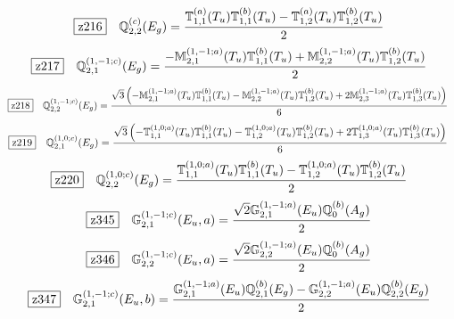 \documentclass[fleqn,10pt,landscape]{jsarticle}
\begin{document}
\begin{dmath*}
\hspace*{3mm}\fbox{z216}\quad \mathbb{Q}_{2,2}^{(c)}(E_{g})=\frac{\mathbb{T}_{1,1}^{(a)}(T_{u}) \mathbb{T}_{1,1}^{(b)}(T_{u}) - \mathbb{T}_{1,2}^{(a)}(T_{u}) \mathbb{T}_{1,2}^{(b)}(T_{u})}{2}
\end{dmath*}
\begin{dmath*}
\hspace*{3mm}\fbox{z217}\quad \mathbb{Q}_{2,1}^{(1,-1;c)}(E_{g})=\frac{- \mathbb{M}_{2,1}^{(1,-1;a)}(T_{u}) \mathbb{T}_{1,1}^{(b)}(T_{u}) + \mathbb{M}_{2,2}^{(1,-1;a)}(T_{u}) \mathbb{T}_{1,2}^{(b)}(T_{u})}{2}
\end{dmath*}
\begin{dmath*}
\hspace*{3mm}\fbox{z218}\quad \mathbb{Q}_{2,2}^{(1,-1;c)}(E_{g})=\frac{\sqrt{3} \left(- \mathbb{M}_{2,1}^{(1,-1;a)}(T_{u}) \mathbb{T}_{1,1}^{(b)}(T_{u}) - \mathbb{M}_{2,2}^{(1,-1;a)}(T_{u}) \mathbb{T}_{1,2}^{(b)}(T_{u}) + 2 \mathbb{M}_{2,3}^{(1,-1;a)}(T_{u}) \mathbb{T}_{1,3}^{(b)}(T_{u})\right)}{6}
\end{dmath*}
\begin{dmath*}
\hspace*{3mm}\fbox{z219}\quad \mathbb{Q}_{2,1}^{(1,0;c)}(E_{g})=\frac{\sqrt{3} \left(- \mathbb{T}_{1,1}^{(1,0;a)}(T_{u}) \mathbb{T}_{1,1}^{(b)}(T_{u}) - \mathbb{T}_{1,2}^{(1,0;a)}(T_{u}) \mathbb{T}_{1,2}^{(b)}(T_{u}) + 2 \mathbb{T}_{1,3}^{(1,0;a)}(T_{u}) \mathbb{T}_{1,3}^{(b)}(T_{u})\right)}{6}
\end{dmath*}
\begin{dmath*}
\hspace*{3mm}\fbox{z220}\quad \mathbb{Q}_{2,2}^{(1,0;c)}(E_{g})=\frac{\mathbb{T}_{1,1}^{(1,0;a)}(T_{u}) \mathbb{T}_{1,1}^{(b)}(T_{u}) - \mathbb{T}_{1,2}^{(1,0;a)}(T_{u}) \mathbb{T}_{1,2}^{(b)}(T_{u})}{2}
\end{dmath*}
\begin{dmath*}
\hspace*{3mm}\fbox{z345}\quad \mathbb{G}_{2,1}^{(1,-1;c)}(E_{u},a)=\frac{\sqrt{2} \mathbb{G}_{2,1}^{(1,-1;a)}(E_{u}) \mathbb{Q}_{0}^{(b)}(A_{g})}{2}
\end{dmath*}
\begin{dmath*}
\hspace*{3mm}\fbox{z346}\quad \mathbb{G}_{2,2}^{(1,-1;c)}(E_{u},a)=\frac{\sqrt{2} \mathbb{G}_{2,2}^{(1,-1;a)}(E_{u}) \mathbb{Q}_{0}^{(b)}(A_{g})}{2}
\end{dmath*}
\begin{dmath*}
\hspace*{3mm}\fbox{z347}\quad \mathbb{G}_{2,1}^{(1,-1;c)}(E_{u},b)=\frac{\mathbb{G}_{2,1}^{(1,-1;a)}(E_{u}) \mathbb{Q}_{2,1}^{(b)}(E_{g}) - \mathbb{G}_{2,2}^{(1,-1;a)}(E_{u}) \mathbb{Q}_{2,2}^{(b)}(E_{g})}{2}
\end{dmath*}
\end{document}
